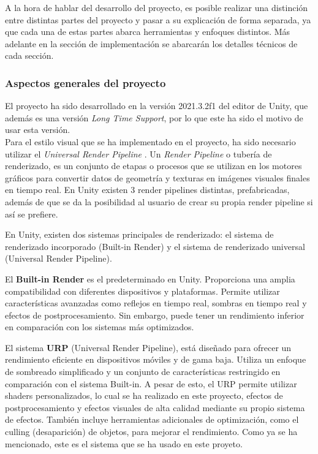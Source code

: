 A la hora de hablar del desarrollo del proyecto, es posible realizar una distinción entre
 distintas partes del proyecto y pasar a su explicación de forma separada, ya que cada una de estas 
 partes abarca herramientas y enfoques distintos. Más adelante en la sección de implementación se abarcarán los detalles técnicos de cada sección.

\subsubsection{Aspectos generales del proyecto}

El proyecto ha sido desarrollado en la versión 2021.3.2f1 \cite{UnityLTS} del editor de Unity, que además es una versión \textit{Long Time Support}, por lo que este ha sido el motivo de usar esta versión.\\

Para el estilo visual que se ha implementado en el proyecto, ha sido necesario utilizar el \textit{Universal Render Pipeline} \cite{URP}. Un \textit{Render Pipeline} \cite{RenderPipeline} o tubería de renderizado, es un conjunto de etapas o procesos que se utilizan en los motores gráficos para convertir datos de geometría y texturas en imágenes visuales finales en tiempo real. En Unity existen 3 render pipelines distintas, prefabricadas, además de que se da la posibilidad al usuario de crear su propia render pipeline si así se prefiere.

En Unity, existen dos sistemas principales de renderizado: el sistema de renderizado incorporado (Built-in Render) y el sistema de renderizado universal (Universal Render Pipeline).

El \textbf{Built-in Render} es el predeterminado en Unity. Proporciona una amplia compatibilidad con diferentes dispositivos y plataformas. Permite utilizar características avanzadas como reflejos en tiempo real, sombras en tiempo real y efectos de postprocesamiento. Sin embargo, puede tener un rendimiento inferior en comparación con los sistemas más optimizados.

El sistema \textbf{URP} (Universal Render Pipeline), está diseñado para ofrecer un rendimiento eficiente en dispositivos móviles y de gama baja. Utiliza un enfoque de sombreado simplificado y un conjunto de características restringido en comparación con el sistema Built-in. A pesar de esto, el URP permite utilizar shaders personalizados, lo cual se ha realizado en este proyecto, efectos de postprocesamiento y efectos visuales de alta calidad mediante su propio sistema de efectos. También incluye herramientas adicionales de optimización, como el culling (desaparición) de objetos, para mejorar el rendimiento. Como ya se ha mencionado, este es el sistema que se ha usado en este proyeto.

